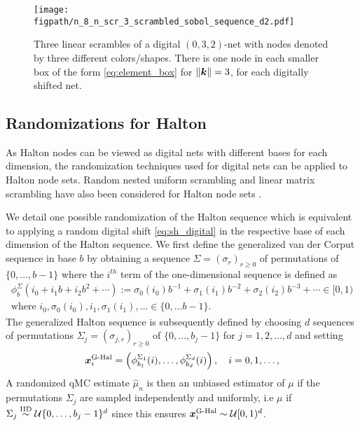 \documentclass{svproc}
\newcommand{\figpath}{Figures}
\begin{document}
\begin{figure}
	\centering
	\texttt{[image: \\figpath/n\_8\_n\_scr\_3\_scrambled\_sobol\_sequence\_d2.pdf]}
	\caption{Three linear scrambles of a digital $(0,3,2)$-net with nodes denoted by three different colors/shapes.  There is one node in each smaller box of the form \eqref{eq:element_box} for $\lVert {\boldsymbol{k}} \rVert = 3$, for each digitally shifted net. \label{fig:scrambled_net}}
\end{figure}

\subsection{Randomizations for Halton}\label{sec:randHalton}


As Halton nodes can be viewed as digital nets with different bases for each dimension, the randomization techniques used for digital nets can be applied to Halton node sets. Random nested uniform scrambling and linear matrix scrambling have also been considered for Halton node sets \cite{owen2024gain}.

We detail one possible randomization of the Halton sequence which is equivalent to applying a random digital shift \eqref{eq:sh_digital} in the respective base of each dimension of the Halton sequence. We first define the generalized van der Corput sequence in base $b$ by obtaining a sequence $\Sigma = (\sigma_r)_{r\geq0}$ of permutations of $\{0,\ldots,b-1\}$ where the $i^{th}$ term of the one-dimensional sequence is defined as 
\begin{multline}\label{eq:gen_vdc}
    \phi_b^{\Sigma}(i_0 + i_1b + i_2 b^2 + \cdots ) := \sigma_0(i_0) b^{-1} + \sigma_1(i_1) b^{-2} + \sigma_2(i_2) b^{-3} + \cdots \in [0,1)
	\\
	 \text{where } i_0, \sigma_0(i_0), i_1, \sigma_1(i_1), \ldots \in \{0,\ldots b-1\}.
\end{multline}
The generalized Halton sequence is subsequently defined by choosing $d$ sequences of permutations $\Sigma_j = (\sigma_{j,r})_{r\geq0}$ of $\{0,\ldots,b_j-1\}$ for $j = 1, 2,\ldots,d$ and setting
$${\boldsymbol{x}}_i^{\text{G-Hal}} = \left( \phi^{\Sigma_1}_{b_1}(i), \ldots, \phi^{\Sigma_d}_{b_d}(i)\right), \quad i= 0,1,\ldots,$$ A randomized qMC estimate $\hat{\mu}_n$ is then an unbiased estimator of $\mu$ if the permutations $\Sigma_j$ are sampled independently and uniformly, i.e $\mu$ if $\Sigma_j \overset{\text{IID}}{\sim} {\mathcal{U}}\{0,\dots,b_j-1\}^d$ since this ensures ${\boldsymbol{x}}_i^{\text{G-Hal}} \sim \mathcal{U}[0,1)^d$. 
\end{document}
